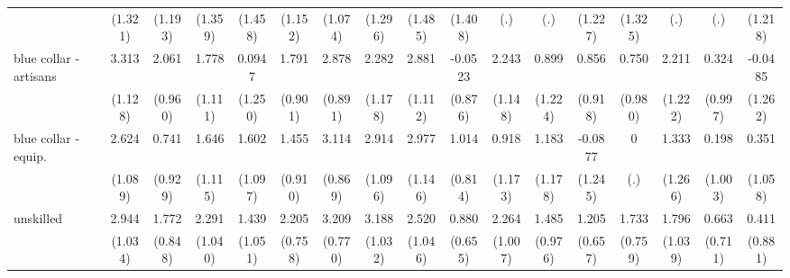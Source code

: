 {\begin{tabular}{l*{16}{c}}
                    &     (1.321)         &     (1.193)         &     (1.359)         &     (1.458)         &     (1.152)         &     (1.074)         &     (1.296)         &     (1.485)         &     (1.408)         &         (.)         &         (.)         &     (1.227)         &     (1.325)         &         (.)         &         (.)         &     (1.218)         \\
[1em]
blue collar - artisans&       3.313\sym{**} &       2.061\sym{*}  &       1.778         &      0.0947         &       1.791\sym{*}  &       2.878\sym{**} &       2.282         &       2.881\sym{**} &     -0.0523         &       2.243         &       0.899         &       0.856         &       0.750         &       2.211         &       0.324         &     -0.0485         \\
                    &     (1.128)         &     (0.960)         &     (1.111)         &     (1.250)         &     (0.901)         &     (0.891)         &     (1.178)         &     (1.112)         &     (0.876)         &     (1.148)         &     (1.224)         &     (0.918)         &     (0.980)         &     (1.222)         &     (0.997)         &     (1.262)         \\
[1em]
blue collar - equip.&       2.624\sym{*}  &       0.741         &       1.646         &       1.602         &       1.455         &       3.114\sym{***}&       2.914\sym{**} &       2.977\sym{**} &       1.014         &       0.918         &       1.183         &     -0.0877         &           0         &       1.333         &       0.198         &       0.351         \\
                    &     (1.089)         &     (0.929)         &     (1.115)         &     (1.097)         &     (0.910)         &     (0.869)         &     (1.096)         &     (1.146)         &     (0.814)         &     (1.173)         &     (1.178)         &     (1.245)         &         (.)         &     (1.266)         &     (1.003)         &     (1.058)         \\
[1em]
unskilled           &       2.944\sym{**} &       1.772\sym{*}  &       2.291\sym{*}  &       1.439         &       2.205\sym{**} &       3.209\sym{***}&       3.188\sym{**} &       2.520\sym{*}  &       0.880         &       2.264\sym{*}  &       1.485         &       1.205         &       1.733\sym{*}  &       1.796         &       0.663         &       0.411         \\
                    &     (1.034)         &     (0.848)         &     (1.040)         &     (1.051)         &     (0.758)         &     (0.770)         &     (1.032)         &     (1.046)         &     (0.655)         &     (1.007)         &     (0.976)         &     (0.657)         &     (0.759)         &     (1.039)         &     (0.711)         &     (0.881)         \\

\end{tabular}}
